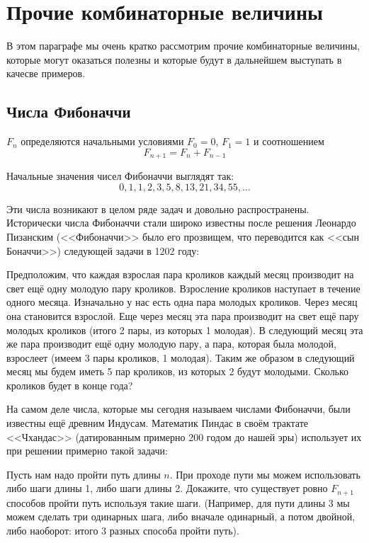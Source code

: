 \section{Прочие комбинаторные величины}

В этом параграфе мы очень кратко рассмотрим прочие комбинаторные величины, которые могут оказаться полезны и которые будут в дальнейшем выступать в качесве примеров.

\subsection{Числа Фибоначчи}

\begin{definition}
 $F_n$ определяются начальными условиями $F_0 = 0$, $F_1 = 1$ и соотношением
$$F_{n+1} = F_n + F_{n-1}$$
\end{definition}

Начальные значения чисел Фибоначчи выглядят так:
$$0, 1, 1, 2, 3, 5, 8, 13, 21, 34, 55, \ldots$$

Эти числа возникают в целом ряде задач и довольно распространены. Исторически числа Фибоначчи стали широко известны после решения Леонардо Пизанским (<<Фибоначчи>>  было его прозвищем, что переводится как <<сын Боначчи>>) следующей задачи в 1202 году:

\begin{exercise}
Предположим, что каждая взрослая пара кроликов каждый месяц производит на свет ещё одну молодую пару кроликов. Взросление кроликов наступает в течение одного месяца. Изначально у нас есть одна пара молодых кроликов. Через месяц она становится взрослой. Еще через месяц эта пара производит на свет ещё пару молодых кроликов (итого 2 пары, из которых 1 молодая). В следующий месяц эта же пара производит ещё одну молодую пару, а пара, которая была молодой, взрослеет (имеем 3 пары кроликов, 1 молодая). Таким же образом в следующий месяц мы будем иметь 5 пар кроликов, из которых 2 будут молодыми. Сколько кроликов будет в конце года?
\end{exercise}

На самом деле числа, которые мы сегодня называем числами Фибоначчи, были известны ещё древним Индусам. Математик Пиндас в своём трактате <<Чхандас>> (датированным примерно 200 годом до нашей эры) использует их при решении примерно такой задачи:

\begin{exercise}
Пусть нам надо пройти путь длины $n$. При проходе пути мы можем использовать либо шаги длины 1, либо шаги длины 2. Докажите, что существует ровно $F_{n+1}$ способов пройти путь используя такие шаги. (Например, для пути длины 3 мы можем сделать три одинарных шага, либо вначале одинарный, а потом двойной, либо наоборот: итого 3 разных способа пройти путь).
\end{exercise}

